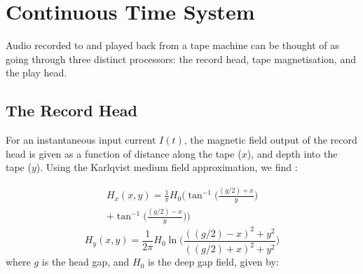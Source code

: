 \documentclass[twoside,a4paper]{article}
\title{\papertitle}
\affiliation{
\paperauthorA \,}
{\href{http://ccrma.stanford.edu}{Center for Computer Research in Music and Acoustics} \\ Stanford University \\ Palo Alto, CA \\ {\tt \href{mailto:jatin@ccrma.stanford.edu}{jatin@ccrma.stanford.edu}}}
\newif\ifpdf
\begin{document}
\ifpdf %
  \DeclareGraphicsExtensions{.png,.jpg,.pdf}
\else  %
\fi

\maketitle

\begin{abstract}
For decades, analog magnetic tape recording was the most popular
method for recording music, but has been replaced over the past 30 years first by
DAT tape, then by DAWs and audio interfaces \cite{Kadis}. Despite being replaced
by higher quality technology, many have sought to recreate a "tape" sound
through digital effects, despite the distortion, tape "hiss", and other
oddities analog tape produced. The following paper describes the general process
of creating a physical model of an analog tape machine starting from basic
physical principles, then discusses in-depth a real-time implementation
of a physical model of a Sony TC-260 tape machine.
\newline\newline
"Whatever you now find weird, ugly, uncomfortable, and nasty
about a new medium will surely become its signature. CD distortion, the jitteriness
of digital video, the crap sound of 8-bit - all of these will be cherished
and emulated as soon as they can be avoided." -Brian Eno \cite{Eno}.
\end{abstract}

\section{Continuous Time System}
Audio recorded to and played back from a tape machine can be thought of as going
through three distinct processors: the record head, tape magnetisation, and the play
head.

\subsection{The Record Head}
For an instantaneous input current $I(t)$, the magnetic field output of the record 
head is given as a function of distance along the tape ($x$), and depth into 
the tape ($y$). Using the Karlqvist medium field approximation, we find
\cite{1994tmr..book.....B}:

\begin{multline}
    H_x(x,y) = \frac{1}{\pi} H_0 \Big(\tan^{-1} \Big(\frac{(g/2) + x}{y} \Big) \\
    + \tan^{-1} \Big(\frac{(g/2) - x}{y} \Big) \Big)
    \label{eq:H_x}
\end{multline}
\begin{equation}
    H_y(x,y) = \frac{1}{2 \pi} H_0 \ln \Big(\frac{((g/2) - x)^2 + y^2}{((g/2) + x)^2 + y^2} \Big)
    \label{eq:H_y}
\end{equation}
%
where $g$ is the head gap, and $H_0$ is the deep gap field, given by:
\end{document}
